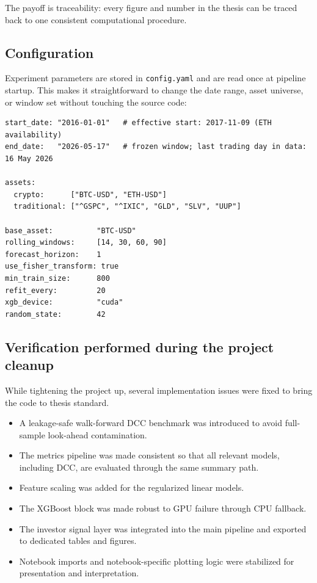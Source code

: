 The payoff is traceability: every figure and number in the thesis can be traced back to one consistent computational procedure.

\subsection{Configuration}

Experiment parameters are stored in \texttt{config.yaml} and are read once at pipeline startup. This makes it straightforward to change the date range, asset universe, or window set without touching the source code:

\begin{lstlisting}[language={}, caption={Excerpt from \texttt{config.yaml} showing key experiment parameters.}, label=lst:config]
start_date: "2016-01-01"   # effective start: 2017-11-09 (ETH availability)
end_date:   "2026-05-17"   # frozen window; last trading day in data: 16 May 2026

assets:
  crypto:      ["BTC-USD", "ETH-USD"]
  traditional: ["^GSPC", "^IXIC", "GLD", "SLV", "UUP"]

base_asset:          "BTC-USD"
rolling_windows:     [14, 30, 60, 90]
forecast_horizon:    1
use_fisher_transform: true
min_train_size:      800
refit_every:         20
xgb_device:          "cuda"
random_state:        42
\end{lstlisting}

\subsection{Verification performed during the project cleanup}

While tightening the project up, several implementation issues were fixed to bring the code to thesis standard.

\begin{itemize}
    \item A leakage-safe walk-forward DCC benchmark was introduced to avoid full-sample look-ahead contamination.
    \item The metrics pipeline was made consistent so that all relevant models, including DCC, are evaluated through the same summary path.
    \item Feature scaling was added for the regularized linear models.
    \item The XGBoost block was made robust to GPU failure through CPU fallback.
    \item The investor signal layer was integrated into the main pipeline and exported to dedicated tables and figures.
    \item Notebook imports and notebook-specific plotting logic were stabilized for presentation and interpretation.
\end{itemize}

